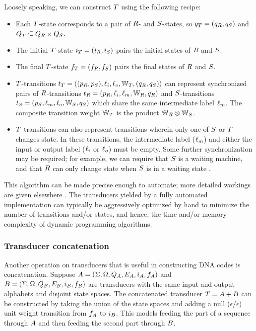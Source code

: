 \documentclass[english]{article}
\begin{document}
Loosely speaking, we can construct $T$ using the following recipe:
\begin{itemize}
\item Each $T$-state corresponds to a pair of $R$- and $S$-states,
so $q_{T} = (q_{R}, q_{S})$
and $Q_{T} \subseteq Q_{R} \times Q_{S}$.
\item The initial $T$-state $i_{T}=(i_{R},i_{S})$ pairs the initial states of $R$ and $S$.
\item The final $T$-state $f_{T}=(f_{R},f_{S})$ pairs the final states of $R$ and $S$.
\item $T$-transitions
$t_{T} = ((p_{R},p_{S}),\ell_i,\ell_o,\mathbb{W}_{T},(q_{R},q_{S}))$
can represent synchronized pairs of $R$-transitions
$t_{R} = (p_{R},\ell_i,\ell_m,\mathbb{W}_{R},q_{R})$
and $S$-transitions
$t_{S} = (p_{S},\ell_m,\ell_o,\mathbb{W}_{S},q_{S})$
which share the same intermediate label $\ell_m$.
The composite transition weight $\mathbb{W}_{T}$ is the product $\mathbb{W}_{R} \otimes \mathbb{W}_{S}$.
\item $T$-transitions can also represent transitions wherein only one of $S$ or $T$ changes state.
In these transitions, the intermediate label ($\ell_m$) and either the input or output label ($\ell_i$ or $\ell_o$)
must be empty.
Some further synchronization may be required; for example, we can require that $S$ is a waiting machine,
and that $R$ can only change state when $S$ is in a waiting state \cite{WestessonEtAlArxiv2012}.
\end{itemize}

This algorithm can be made precise enough to automate;
more detailed workings are given elsewhere \cite{PereiraRiley1996,MohriPereiraRiley2000,Holmes2003,Holmes2007,WestessonEtAlArxiv2012,WestessonEtAl2012}.
The transducers yielded by a fully automated implementation can typically be aggressively optimized by hand
to minimize the number of transitions and/or states,
and hence,
the time and/or memory complexity of dynamic programming algorithms.

\subsubsection{Transducer concatenation}

Another operation on transducers that is useful in constructing DNA codes
is concatenation.
Suppose
 $A = (\Sigma, \Omega, Q_{A}, E_{A}, i_{A}, f_{A})$ and
 $B = (\Sigma, \Omega, Q_{B}, E_{B}, i_{B}, f_{B})$
are transducers with the same input and output alphabets and disjoint state spaces.
The concatenated transducer $T = A + B$ can be constructed by
taking the union of the state spaces and adding a null ($\epsilon/\epsilon$) unit weight transition
from $f_{A}$ to $i_{B}$.
This models feeding the part of a sequence through $A$ and then feeding the second part through $B$.
\end{document}
